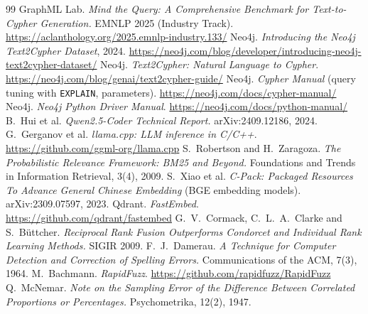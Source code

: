 \documentclass[11pt,a4paper]{article}
\begin{document}
\begin{thebibliography}{99}
\setlength{\itemsep}{0.05em}
\footnotesize
{} GraphML Lab. \emph{Mind the Query: A Comprehensive Benchmark for
  Text-to-Cypher Generation.} EMNLP 2025 (Industry Track).
  \url{https://aclanthology.org/2025.emnlp-industry.133/}
 Neo4j. \emph{Introducing the Neo4j Text2Cypher Dataset}, 2024.
  \url{https://neo4j.com/blog/developer/introducing-neo4j-text2cypher-dataset/}
 Neo4j. \emph{Text2Cypher: Natural Language to Cypher}.
  \url{https://neo4j.com/blog/genai/text2cypher-guide/}
 Neo4j. \emph{Cypher Manual} (query tuning with \texttt{EXPLAIN},
  parameters). \url{https://neo4j.com/docs/cypher-manual/}
 Neo4j. \emph{Neo4j Python Driver Manual}.
  \url{https://neo4j.com/docs/python-manual/}
 B.~Hui et al. \emph{Qwen2.5-Coder Technical Report.} arXiv:2409.12186, 2024.
 G.~Gerganov et al. \emph{llama.cpp: LLM inference in C/C++}.
  \url{https://github.com/ggml-org/llama.cpp}
 S.~Robertson and H.~Zaragoza. \emph{The Probabilistic Relevance Framework:
  BM25 and Beyond.} Foundations and Trends in Information Retrieval, 3(4), 2009.
 S.~Xiao et al. \emph{C-Pack: Packaged Resources To Advance General Chinese
  Embedding} (BGE embedding models). arXiv:2309.07597, 2023.
 Qdrant. \emph{FastEmbed}. \url{https://github.com/qdrant/fastembed}
 G.~V.~Cormack, C.~L.~A.~Clarke and S.~B\"uttcher. \emph{Reciprocal Rank Fusion
  Outperforms Condorcet and Individual Rank Learning Methods.} SIGIR 2009.
 F.~J.~Damerau. \emph{A Technique for Computer Detection and Correction of
  Spelling Errors.} Communications of the ACM, 7(3), 1964.
 M.~Bachmann. \emph{RapidFuzz}. \url{https://github.com/rapidfuzz/RapidFuzz}
 Q.~McNemar. \emph{Note on the Sampling Error of the Difference Between
  Correlated Proportions or Percentages.} Psychometrika, 12(2), 1947.
\end{thebibliography}
\end{document}
